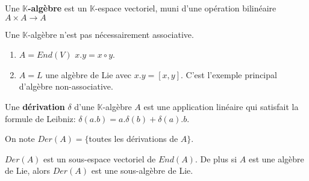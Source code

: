 \documentclass[a4paper,openany,12pt]{report}
\newcommand{\KK}{\mathbb{K}}
\theoremstyle{break}
{\theorembodyfont{\upshape}
\newtheorem*{rmq}{Remarque :}
\newtheorem*{prv}{Preuve :}
\newtheorem*{ex}{Exemples :}
\newtheorem*{exe}{Exemple : }
\newtheorem*{nota}{Notation :}
\newtheorem*{dem}{D\'emonstration :}}
\begin{document}
\begin{df}
\quad Une \textbf{$\KK$-algèbre} est un $\KK$-espace vectoriel, muni d'une opération bilinéaire $A \times A \to  A$
\end{df}

\begin{rmq}
\quad Une $\KK$-algèbre n'est pas nécessairement associative.
\end{rmq}

\begin{ex}
\begin{enumerate}
\item $A=End(V)$ \quad $x.y=x\circ y$.

\item $A=L$ une algèbre de Lie avec $x. y= [x,y]$. C'est l'exemple principal d'algèbre non-associative.
\end{enumerate}
\end{ex}

\begin{df}
\quad Une \textbf{dérivation} $\delta$ d'une $\KK$-algèbre $A$ est une application linéaire qui satisfait la formule de Leibniz:
\center $\delta(a.b)=a.\delta(b)+\delta(a).b$.
\end{df}

\begin{nota}
\quad On note $Der(A)=\{ $toutes les dérivations de $A \}$.
\end{nota}

\begin{prop}
\quad $Der(A)$ est un sous-espace vectoriel de $End(A)$.
De plus si $A$ est une algèbre de Lie, alors $Der(A)$ est une sous-algèbre de Lie. 
\end{prop}
\end{document}
